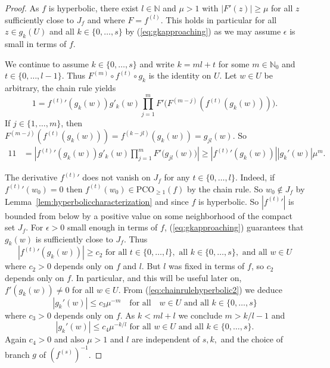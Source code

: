 \documentclass[10pt,a4paper]{amsart}
\newcommand{\varw}{z}
\newcommand{\varz}{w}
\newcommand{\IN}{\mathbb{N}}
\newcommand{\pco}{\mathrm{PCO}}
\begin{document}
\begin{proof}
  As $f$ is hyperbolic, there exist $l\in\IN$ and $\mu > 1$ with
  $|F'(\varw)|\ge \mu$ for all $\varw$ sufficiently close to $J_f$ and where
  $F = f^{(l)}$. 
  This holds in particular for all  $z\in g_k(U)$ and all $k\in
  \{0,\ldots,s\}$ by
  (\ref{eq:gkapproaching}) as we may assume $\epsilon$ is small in
  terms of $f$.

  We continue to assume $k\in\{0,\ldots,s\}$ and 
  write $k=ml+t$ for some $m\in\IN_0$
  and $t\in \{0,\ldots,l-1\}$. Thus
  $F^{(m)}\circ f^{(t)}\circ g_k$  is the identity on $U$.
  Let $\varz\in U$ be arbitrary, the chain rule yields
  \begin{equation}
    \label{eq:chainrulehyperbolic}
    1 =    {f^{(t)}}'(g_k(\varz)) g'_k(\varz)\prod_{j=1}^m
      F'\bigl(F^{(m-j)}(f^{(t)}(g_k(\varz)))\bigr).
  \end{equation}
  If $j\in \{1,\ldots,m\}$, then
  $F^{(m-j)}(f^{(t)}(g_k(\varz))) = f^{(k-jl)}(g_{k}(\varz)) =
  g_{jl}(\varz)$. So 
  \begin{alignat}1
    \label{eq:chainrulehyperbolic2}
    1 &=
    \left|      {f^{(t)}}'(g_k(\varz)) g'_k(\varz)\prod_{j=1}^m F'\bigl(g_{jl}(w)\bigr)
\right|
    \ge    |      {f^{(t)}}'(g_k(\varz))| |g_k'(\varz)|\mu^m.
  \end{alignat}

  The derivative ${f^{(t)}}'$ does not vanish on $J_f$ for any $t\in
  \{0,\ldots,l\}$.
  Indeed, if
  ${f^{(t)}}'(w_0)=0$ then $f^{(t)}(w_0) \in \pco_{\ge 1}(f)$ by the
  chain rule.
  So $w_0\not\in J_f$ by Lemma~\ref{lem:hyperboliccharacterization}
  and since $f$ is hyperbolic. 
  So $|{f^{(t)}}'|$ is bounded from below
  by a positive value on some neighborhood of the compact set $J_f$. For
  $\epsilon>0$ small enough in terms of $f$, (\ref{eq:gkapproaching}) guarantees
  that $g_k(w)$ is sufficiently close to $J_f$. Thus
  \begin{equation*}
    |{f^{(t)}}'(g_k(w))|\ge c_2
    \text{ for all } t\in
    \{0,\ldots,l\},\text{ all }k\in\{0,\ldots,s\},\text{ and all }w\in U
  \end{equation*}
  where $c_2>0$ depends only on $f$ and $l$. But $l$ was fixed in
  terms of $f$, so $c_2$ depends only on $f$. 
  In particular, and this will be useful later on, $f'(g_k(w))\not=0$ for all $w\in U$.
  From (\ref{eq:chainrulehyperbolic2}) 
  we deduce
  \begin{equation*}
    |g_k'(w)|\le c_3 \mu^{-m}\quad\text{for all}\quad w\in U
    \text{ and all } k\in \{0,\ldots,s\}
  \end{equation*}
  where $c_3>0$ depends only on $f$. 
  As $k< ml+l$ we conclude $m> k/l-1$ and
  \begin{equation}
    \label{eq:gkprime}
    |g_k'(\varz)|\le c_4  \mu^{-k/l}\text{ for all } \varz\in U
    \text{ and all } k\in \{0,\ldots,s\}.
  \end{equation}
  Again $c_4>0$ and also $\mu>1$ and $l$ 
  are independent of $s,k,$ and the
  choice of branch $g$ of $(f^{(s)})^{-1}$.
  

\end{proof}
\end{document}
